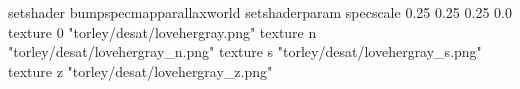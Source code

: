 setshader bumpspecmapparallaxworld
setshaderparam specscale 0.25 0.25 0.25 0.0
texture 0 "torley/desat/lovehergray.png"
texture n "torley/desat/lovehergray_n.png"
texture s "torley/desat/lovehergray_s.png"
texture z "torley/desat/lovehergray_z.png"

